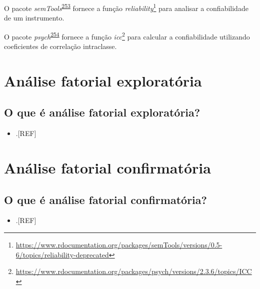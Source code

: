 \documentclass[
  a4paper,
]{book}
\providecommand{\tightlist}{%
  \setlength{\itemsep}{0pt}\setlength{\parskip}{0pt}}
\renewcommand{\href}[2]{#2\footnote{\url{#1}}}
\newenvironment{infobox}[1]
  {
  \begin{itemize}
  \renewcommand{\labelitemi}{
    \raisebox{-.7\height}[0pt][0pt]{
      {\setkeys{Gin}{width=3em,keepaspectratio}
        \texttt{[image: \#1]}}
    }
  }
  \setlength{\fboxsep}{1em}
  \begin{blackbox}
  \item
  }
  {
  \end{blackbox}
  \end{itemize}
  }
\begin{document}
\begin{infobox}{images/Rlogo}
O pacote \emph{semTools}\textsuperscript{\protect\hyperlink{ref-semTools}{253}} fornece a função \href{https://www.rdocumentation.org/packages/semTools/versions/0.5-6/topics/reliability-deprecated}{\emph{reliability}} para analisar a confiabilidade de um instrumento.

\end{infobox}

\begin{infobox}{images/Rlogo}
O pacote \emph{psych}\textsuperscript{\protect\hyperlink{ref-psych-2}{254}} fornece a função \href{https://www.rdocumentation.org/packages/psych/versions/2.3.6/topics/ICC}{\emph{icc}} para calcular a confiabilidade utilizando coeficientes de correlação intraclasse.

\end{infobox}

\hypertarget{analise-fatorial-exploratoria}{%
\section{Análise fatorial exploratória}\label{analise-fatorial-exploratoria}}

\hypertarget{o-que-uxe9-anuxe1lise-fatorial-exploratuxf3ria}{%
\subsection{O que é análise fatorial exploratória?}\label{o-que-uxe9-anuxe1lise-fatorial-exploratuxf3ria}}

\begin{itemize}
\tightlist
\item
  .{[}REF{]}
\end{itemize}

\hypertarget{analise-fatorial-ocnfirmatoria}{%
\section{Análise fatorial confirmatória}\label{analise-fatorial-ocnfirmatoria}}

\hypertarget{o-que-uxe9-anuxe1lise-fatorial-confirmatuxf3ria}{%
\subsection{O que é análise fatorial confirmatória?}\label{o-que-uxe9-anuxe1lise-fatorial-confirmatuxf3ria}}

\begin{itemize}
\tightlist
\item
  .{[}REF{]}
\end{itemize}
\end{document}
